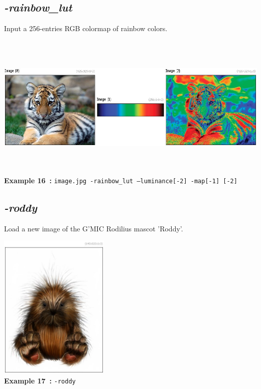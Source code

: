\documentclass[a4paper,11pt,twoside]{book}
\begin{document}
\subsection{\emph{-rainbow\_lut} }\vspace*{-0.5em}
Input a 256-entries RGB colormap of rainbow colors.
\begin{center}\includegraphics[keepaspectratio=true,height=7cm,width=\textwidth]{img/gmic_def16.jpg}\\
{\footnotesize \textbf{Example 16~:} \texttt{image.jpg -rainbow\_lut --luminance[-2] -map[-1] [-2]}}
\end{center}

\subsection{\emph{-roddy} }\vspace*{-0.5em}
Load a new image of the G'MIC Rodilius mascot 'Roddy'.
\begin{center}\includegraphics[keepaspectratio=true,height=7cm,width=\textwidth]{img/gmic_def17.jpg}\\
{\footnotesize \textbf{Example 17~:} \texttt{-roddy}}
\end{center}
\end{document}
